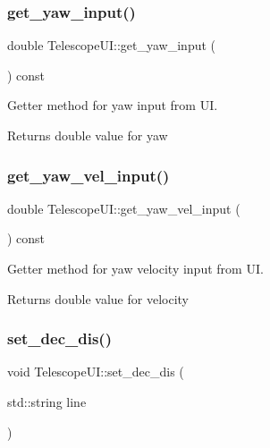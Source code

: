 \subsubsection{\texorpdfstring{get\+\_\+yaw\+\_\+input()}{get\_yaw\_input()}}
{\footnotesize\ttfamily double Telescope\+U\+I\+::get\+\_\+yaw\+\_\+input (\begin{DoxyParamCaption}{ }\end{DoxyParamCaption}) const}



Getter method for yaw input from UI. 

\begin{DoxyReturn}{Returns}
double value for yaw 
\end{DoxyReturn}
\mbox{\label{classTelescopeUI_a5e3914156cf53cb53851285186d3fbfc}} 
\subsubsection{\texorpdfstring{get\+\_\+yaw\+\_\+vel\+\_\+input()}{get\_yaw\_vel\_input()}}
{\footnotesize\ttfamily double Telescope\+U\+I\+::get\+\_\+yaw\+\_\+vel\+\_\+input (\begin{DoxyParamCaption}{ }\end{DoxyParamCaption}) const}



Getter method for yaw velocity input from UI. 

\begin{DoxyReturn}{Returns}
double value for velocity 
\end{DoxyReturn}
\mbox{\label{classTelescopeUI_a783632af5cec9a781f0228204b7d4126}} 
\subsubsection{\texorpdfstring{set\+\_\+dec\+\_\+dis()}{set\_dec\_dis()}}
{\footnotesize\ttfamily void Telescope\+U\+I\+::set\+\_\+dec\+\_\+dis (\begin{DoxyParamCaption}\item[{std\+::string}]{line }\end{DoxyParamCaption})}



